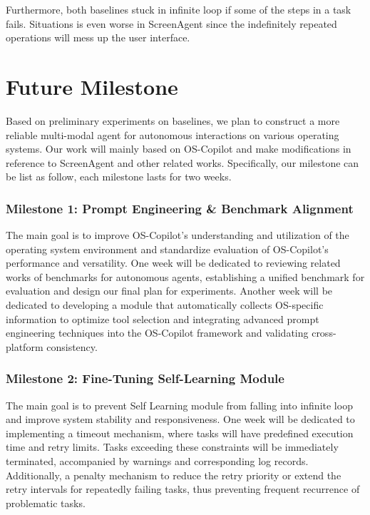 \documentclass[11pt,letterpaper]{article}
\begin{document}
%
Furthermore, both baselines stuck in infinite loop if some of the steps in a task fails. 
%
Situations is even worse in ScreenAgent since the indefinitely repeated operations will mess up the user interface. 
%

\section{Future Milestone}
Based on preliminary experiments on baselines, we plan to construct a more reliable multi-modal agent for autonomous interactions on various operating systems. Our work will mainly based on OS-Copilot and make modifications in reference to ScreenAgent and other related works. Specifically, our milestone can be list as follow, each milestone lasts for two weeks.


\subsubsection*{Milestone 1: Prompt Engineering \& Benchmark Alignment}
The main goal is to improve OS-Copilot's understanding and utilization of the operating system environment and standardize evaluation of OS-Copilot's performance and versatility.
%
One week will be dedicated to reviewing related works of benchmarks for autonomous agents, establishing a unified benchmark for evaluation and design our final plan for experiments.
%
Another week will be dedicated to developing a module that automatically collects OS-specific information to optimize tool selection and integrating advanced prompt engineering techniques into the OS-Copilot framework and validating cross-platform consistency.

\subsubsection*{Milestone 2: Fine-Tuning Self-Learning Module}
The main goal is to prevent Self Learning module from falling into infinite loop and improve system stability and responsiveness. 
%
One week will be dedicated to implementing a timeout mechanism, where tasks will have predefined execution time and retry limits. 
%
Tasks exceeding these constraints will be immediately terminated, accompanied by warnings and corresponding log records. 
%
Additionally, a penalty mechanism to reduce the retry priority or extend the retry intervals for repeatedly failing tasks, thus preventing frequent recurrence of problematic tasks.
\end{document}
